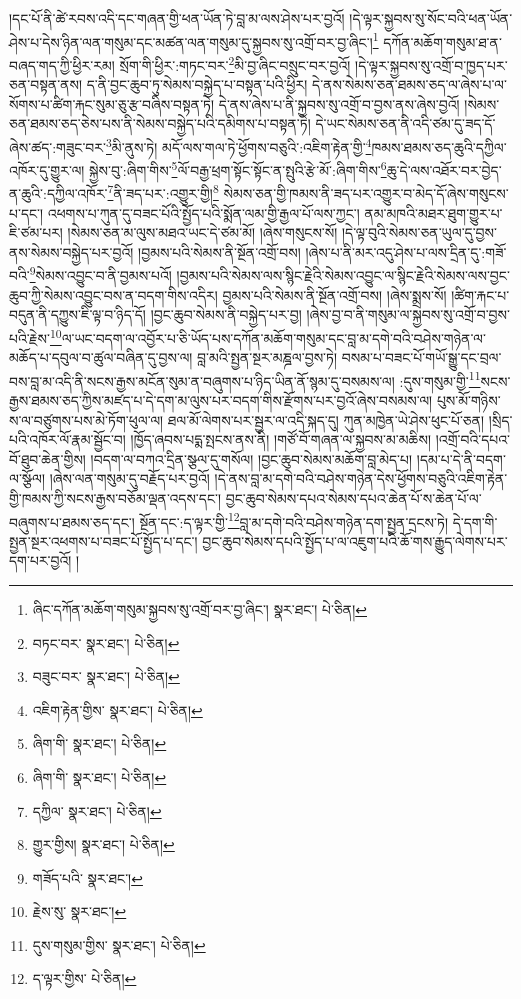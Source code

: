 །དང་པོ་ནི་ཚེ་རབས་འདི་དང་གཞན་གྱི་ཕན་ཡོན་ཏེ་བླ་མ་ལས་ཤེས་པར་བྱའོ། །དེ་ལྟར་སྐྱབས་སུ་སོང་བའི་ཕན་ཡོན་ཤེས་པ་དེས་ཉིན་ལན་གསུམ་དང་མཚན་ལན་གསུམ་དུ་སྐྱབས་སུ་འགྲོ་བར་བྱ་ཞིང་།\footnote{ཞིང་དཀོན་མཆོག་གསུམ་སྐྱབས་སུ་འགྲོ་བར་བྱ་ཞིང་།  སྣར་ཐང་།  པེ་ཅིན། } དཀོན་མཆོག་གསུམ་ཐ་ན་བཞད་གད་ཀྱི་ཕྱིར་རམ། སྲོག་གི་ཕྱིར་:གཏང་བར་\footnote{བཏང་བར་  སྣར་ཐང་།  པེ་ཅིན། }མི་བྱ་ཞིང་བསྲུང་བར་བྱའོ། །དེ་ལྟར་སྐྱབས་སུ་འགྲོ་བ་ཁྱད་པར་ཅན་བསྟན་ནས། ད་ནི་བྱང་ཆུབ་ཏུ་སེམས་བསྐྱེད་པ་བསྟན་པའི་ཕྱིར། དེ་ནས་སེམས་ཅན་ཐམས་ཅད་ལ་ཞེས་པ་ལ་སོགས་པ་ཚིག་རྐང་སུམ་ཅུ་རྩ་བཞིས་བསྟན་ཏེ། དེ་ནས་ཞེས་པ་ནི་སྐྱབས་སུ་འགྲོ་བ་བྱས་ནས་ཞེས་བྱའོ། །སེམས་ཅན་ཐམས་ཅད་ཅེས་པས་ནི་སེམས་བསྐྱེད་པའི་དམིགས་པ་བསྟན་ཏེ། དེ་ཡང་སེམས་ཅན་ནི་འདི་ཙམ་དུ་ཟད་དོ་ཞེས་ཚད་:གཟུང་བར་\footnote{བཟུང་བར་  སྣར་ཐང་།  པེ་ཅིན། }མི་ནུས་ཏེ། མདོ་ལས་གལ་ཏེ་ཕྱོགས་བཅུའི་:འཇིག་རྟེན་གྱི་\footnote{འཇིག་རྟེན་གྱིས་  སྣར་ཐང་།  པེ་ཅིན། }ཁམས་ཐམས་ཅད་ཆུའི་དཀྱིལ་འཁོར་དུ་གྱུར་ལ། སྐྱེས་བུ་:ཞིག་གིས་\footnote{ཞིག་གི་  སྣར་ཐང་།  པེ་ཅིན། }ལོ་བརྒྱ་ཕྲག་སྟོང་སྟོང་ན་སྤུའི་རྩེ་མོ་:ཞིག་གིས་\footnote{ཞིག་གི་  སྣར་ཐང་།  པེ་ཅིན། }ཆུ་དེ་ལས་འཐོར་བར་བྱེད་ན་ཆུའི་:དཀྱིལ་འཁོར་\footnote{དཀྱིལ་  སྣར་ཐང་།  པེ་ཅིན། }ནི་ཟད་པར་:འགྱུར་གྱི།\footnote{གྱུར་གྱིས།  སྣར་ཐང་།  པེ་ཅིན། } སེམས་ཅན་གྱི་ཁམས་ནི་ཟད་པར་འགྱུར་བ་མེད་དོ་ཞེས་གསུངས་པ་དང་། འཕགས་པ་ཀུན་དུ་བཟང་པོའི་སྤྱོད་པའི་སྨོན་ལམ་གྱི་རྒྱལ་པོ་ལས་ཀྱང་། ནམ་མཁའི་མཐར་ཐུག་གྱུར་པ་ཇི་ཙམ་པར། །སེམས་ཅན་མ་ལུས་མཐའ་ཡང་དེ་ཙམ་མོ། །ཞེས་གསུངས་སོ། །དེ་ལྟ་བུའི་སེམས་ཅན་ཡུལ་དུ་བྱས་ནས་སེམས་བསྐྱེད་པར་བྱའོ། །བྱམས་པའི་སེམས་ནི་སྔོན་འགྲོ་བས། །ཞེས་པ་ནི་མར་འདུ་ཤེས་པ་ལས་དྲིན་དུ་:གཟོ་བའི་\footnote{གཟོད་པའི་  སྣར་ཐང་། }སེམས་འབྱུང་བ་ནི་བྱམས་པའོ། །བྱམས་པའི་སེམས་ལས་སྙིང་རྗེའི་སེམས་འབྱུང་ལ་སྙིང་རྗེའི་སེམས་ལས་བྱང་ཆུབ་ཀྱི་སེམས་འབྱུང་བས་ན་བདག་གིས་འདིར། བྱམས་པའི་སེམས་ནི་སྔོན་འགྲོ་བས། །ཞེས་སྨྲས་སོ། །ཚིག་རྐང་པ་བདུན་ནི་དཀྱུས་ཇི་ལྟ་བ་ཉིད་དོ། །བྱང་ཆུབ་སེམས་ནི་བསྐྱེད་པར་བྱ། །ཞེས་བྱ་བ་ནི་གསུམ་ལ་སྐྱབས་སུ་འགྲོ་བ་བྱས་པའི་རྗེས་\footnote{རྗེས་སུ་  སྣར་ཐང་། }ལ་ཡང་བདག་ལ་འབྱོར་པ་ཅི་ཡོད་པས་དཀོན་མཆོག་གསུམ་དང་བླ་མ་དགེ་བའི་བཤེས་གཉེན་ལ་མཆོད་པ་དབུལ་བ་ཚུལ་བཞིན་དུ་བྱས་ལ། བླ་མའི་སྤྱན་སྔར་མཎྜལ་བྱས་ཏེ། བསམ་པ་བཟང་པོ་གཡོ་སྒྱུ་དང་བྲལ་བས་བླ་མ་འདི་ནི་སངས་རྒྱས་མངོན་སུམ་ན་བཞུགས་པ་ཉིད་ཡིན་ནོ་སྙམ་དུ་བསམས་ལ། :དུས་གསུམ་གྱི་\footnote{དུས་གསུམ་གྱིས་  སྣར་ཐང་།  པེ་ཅིན། }སངས་རྒྱས་ཐམས་ཅད་ཀྱིས་མཛད་པ་དེ་དག་མ་ལུས་པར་བདག་གིས་རྫོགས་པར་བྱའོ་ཞེས་བསམས་ལ། པུས་མོ་གཉིས་ས་ལ་བཙུགས་པས་མེ་ཏོག་ཕུལ་ལ། ཐལ་མོ་ལེགས་པར་སྦྱར་ལ་འདི་སྐད་དུ། ཀུན་མཁྱེན་ཡེ་ཤེས་ཕུང་པོ་ཅན། །སྲིད་པའི་འཁོར་ལོ་རྣམ་སྦྱོང་བ། །ཁྱོད་ཞབས་པདྨ་སྤངས་ནས་ནི། །གཙོ་བོ་གཞན་ལ་སྐྱབས་མ་མཆིས། །འགྲོ་བའི་དཔའ་བོ་ཐུབ་ཆེན་གྱིས། །བདག་ལ་བཀའ་དྲིན་སྩལ་དུ་གསོལ། །བྱང་ཆུབ་སེམས་མཆོག་བླ་མེད་པ། །དམ་པ་དེ་ནི་བདག་ལ་སྩོལ། །ཞེས་ལན་གསུམ་དུ་བརྗོད་པར་བྱའོ། །དེ་ནས་བླ་མ་དགེ་བའི་བཤེས་གཉེན་དེས་ཕྱོགས་བཅུའི་འཇིག་རྟེན་གྱི་ཁམས་ཀྱི་སངས་རྒྱས་བཅོམ་ལྡན་འདས་དང་། བྱང་ཆུབ་སེམས་དཔའ་སེམས་དཔའ་ཆེན་པོ་ས་ཆེན་པོ་ལ་བཞུགས་པ་ཐམས་ཅད་དང་། སྔོན་དང་:ད་ལྟར་གྱི་\footnote{ད་ལྟར་གྱིས་  པེ་ཅིན། }བླ་མ་དགེ་བའི་བཤེས་གཉེན་དག་སྤྱན་དྲངས་ཏེ། དེ་དག་གི་སྤྱན་སྔར་འཕགས་པ་བཟང་པོ་སྤྱོད་པ་དང་། བྱང་ཆུབ་སེམས་དཔའི་སྤྱོད་པ་ལ་འཇུག་པའི་ཆོ་གས་རྒྱུད་ལེགས་པར་དག་པར་བྱའོ། །
